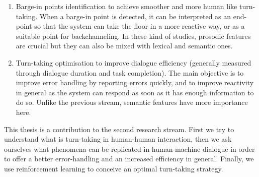     \begin{enumerate}
    	\item Barge-in points identification to achieve smoother and more human like turn-taking. When a barge-in point is detected, it can be interpreted as an end-point so that the system can take the floor in a more reactive way, or as a suitable point for backchanneling. In these kind of studies, prosodic features are crucial but they can also be mixed with lexical and semantic ones.
        \item Turn-taking optimisation to improve dialogue efficiency (generally measured through dialogue duration and task completion). The main objective is to improve error handling by reporting errors quickly, and to improve reactivity in general as the system can respond as soon as it has enough information to do so. Unlike the previous stream, semantic features have more importance here.
    \end{enumerate}
    
    This thesis is a contribution to the second research stream. First we try to understand what is turn-taking in human-human interaction, then we ask ourselves what phenomena can be replicated in human-machine dialogue in order to offer a better error-handling and an increased efficiency in general. Finally, we use reinforcement learning to conceive an optimal turn-taking strategy.
    
    
    
    
    
    

